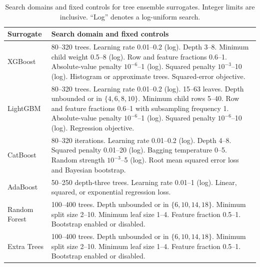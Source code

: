 \begin{table}[htbp]
\centering\small
\caption{Search domains and fixed controls for tree ensemble surrogates. Integer limits are inclusive. ``Log'' denotes a log-uniform search.}\label{tab:surrogate_search_domains}
\begin{tabular}{p{2.65cm}p{9.2cm}}
\toprule
Surrogate & Search domain and fixed controls\\
\midrule
XGBoost & 80--320 trees. Learning rate 0.01--0.2 (log). Depth 3--8. Minimum child weight 0.5--8 (log). Row and feature fractions 0.6--1. Absolute-value penalty $10^{-6}$--1 (log). Squared penalty $10^{-3}$--10 (log). Histogram or approximate trees. Squared-error objective.\\
LightGBM & 80--320 trees. Learning rate 0.01--0.2 (log). 15--63 leaves. Depth unbounded or in $\{4,6,8,10\}$. Minimum child rows 5--40. Row and feature fractions 0.6--1 with subsampling frequency 1. Absolute-value penalty $10^{-6}$--1 (log). Squared penalty $10^{-6}$--10 (log). Regression objective.\\
CatBoost & 80--320 iterations. Learning rate 0.01--0.2 (log). Depth 4--8. Squared penalty 0.01--20 (log). Bagging temperature 0--5. Random strength $10^{-3}$--5 (log). Root mean squared error loss and Bayesian bootstrap.\\
AdaBoost & 50--250 depth-three trees. Learning rate 0.01--1 (log). Linear, squared, or exponential regression loss.\\
Random Forest & 100--400 trees. Depth unbounded or in $\{6,10,14,18\}$. Minimum split size 2--10. Minimum leaf size 1--4. Feature fraction 0.5--1. Bootstrap enabled or disabled.\\
Extra Trees & 100--400 trees. Depth unbounded or in $\{6,10,14,18\}$. Minimum split size 2--10. Minimum leaf size 1--4. Feature fraction 0.5--1. Bootstrap enabled or disabled.\\
\bottomrule
\end{tabular}
\end{table}

